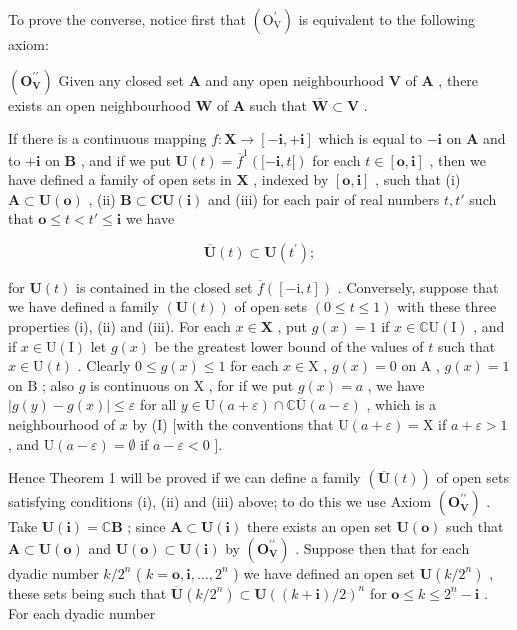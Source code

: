 To prove the converse, notice first that \((\mathrm{O}_{\mathrm{V}}^{\prime})\) is equivalent to the following axiom:

\((\mathbf{O}_{\mathbf{V}}^{\prime \prime})\) Given any closed set \(\mathbf{A}\) and any open neighbourhood \(\mathbf{V}\) of \(\mathbf{A}\) , there exists an open neighbourhood \(\mathbf{W}\) of \(\mathbf{A}\) such that \(\overline{\mathbf{W}} \subset \mathbf{V}\) .

If there is a continuous mapping \(f: \mathbf{X} \to [-\mathbf{i}, +\mathbf{i}]\) which is equal to \(-\mathbf{i}\) on \(\mathbf{A}\) and to \(+\mathbf{i}\) on \(\mathbf{B}\) , and if we put \(\mathbf{U}(t) = \overline{f}^1([-\mathbf{i}, t[)\) for each \(t \in [\mathbf{o}, \mathbf{i}]\) , then we have defined a family of open sets in \(\mathbf{X}\) , indexed by \([\mathbf{o}, \mathbf{i}]\) , such that (i) \(\mathbf{A} \subset \mathbf{U}(\mathbf{o})\) , (ii) \(\mathbf{B} \subset \mathbf{C}\mathbf{U}(\mathbf{i})\) and (iii) for each pair of real numbers \(t, t'\) such that \(\mathbf{o} \leqslant t < t' \leqslant \mathbf{i}\) we have

\[
\overline {{{\mathbf {U}}}} (t) \subset \mathbf {U} (t ^ {\prime});\tag{1}
\]

for \(\mathbf{U}(t)\) is contained in the closed set \(\overline{f}([-\mathrm{i}, t])\) . Conversely, suppose that we have defined a family \((\mathbf{U}(t))\) of open sets \((0 \leqslant t \leqslant 1)\) with these three properties (i), (ii) and (iii). For each \(x \in \mathbf{X}\) , put \(g(x) = 1\) if \(x \in \mathbb{C}\mathrm{U}(\mathrm{I})\) , and if \(x \in \mathrm{U}(\mathrm{I})\) let \(g(x)\) be the greatest lower bound of the values of \(t\) such that \(x \in \mathrm{U}(t)\) . Clearly \(0 \leqslant g(x) \leqslant 1\) for each \(x \in \mathrm{X}\) , \(g(x) = 0\) on \(\mathrm{A}\) , \(g(x) = 1\) on \(\mathrm{B}\) ; also \(g\) is continuous on \(\mathrm{X}\) , for if we put \(g(x) = a\) , we have \(|g(y) - g(x)| \leqslant \varepsilon\) for all \(y \in \mathrm{U}(a + \varepsilon) \cap \mathbb{C}\overline{\mathrm{U}}(a - \varepsilon)\) , which is a neighbourhood of \(x\) by (I) {[}with the conventions that \(\mathrm{U}(a + \varepsilon) = \mathrm{X}\) if \(a + \varepsilon > 1\) , and \(\mathrm{U}(a - \varepsilon) = \emptyset\) if \(a - \varepsilon < 0\) {]}.

Hence Theorem 1 will be proved if we can define a family \((\overline{\mathbf{U}}(t))\) of open sets satisfying conditions (i), (ii) and (iii) above; to do this we use Axiom \((\mathbf{O}_{\mathbf{V}}^{\prime \prime})\) . Take \(\mathbf{U}(\mathbf{i}) = \mathbb{C}\mathbf{B}\) ; since \(\mathbf{A} \subset \mathbf{U}(\mathbf{i})\) there exists an open set \(\mathbf{U}(\mathbf{o})\) such that \(\mathbf{A} \subset \mathbf{U}(\mathbf{o})\) and \(\mathbf{U}(\mathbf{o}) \subset \mathbf{U}(\mathbf{i})\) by \((\mathbf{O}_{\mathbf{V}}^{\prime \prime})\) . Suppose then that for each dyadic number \(k / 2^n\) ( \(k = \mathbf{o}, \mathbf{i}, \ldots, 2^n\) ) we have defined an open set \(\mathbf{U}(k / 2^n)\) , these sets being such that \(\overline{\mathbf{U}}(k / 2^n) \subset \mathbf{U}((k + \mathbf{i}) / 2)^n\) for \(\mathbf{o} \leqslant k \leqslant 2^n - \mathbf{i}\) . For each dyadic number

